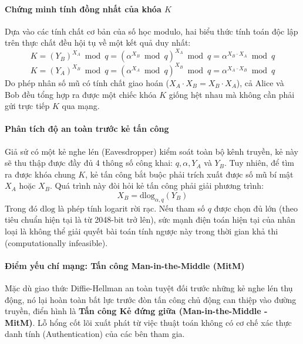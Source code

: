 \paragraph*{Chứng minh tính đồng nhất của khóa $K$}
Dựa vào các tính chất cơ bản của số học modulo, hai biểu thức tính toán độc lập trên thực chất đều hội tụ về một kết quả duy nhất:
$$K = (Y_B)^{X_A} \bmod q = (\alpha^{X_B} \bmod q)^{X_A} \bmod q = \alpha^{X_B \cdot X_A} \bmod q$$
$$K = (Y_A)^{X_B} \bmod q = (\alpha^{X_A} \bmod q)^{X_B} \bmod q = \alpha^{X_A \cdot X_B} \bmod q$$
Do phép nhân số mũ có tính chất giao hoán ($X_A \cdot X_B = X_B \cdot X_A$), cả Alice và Bob đều tổng hợp ra được một chiếc khóa $K$ giống hệt nhau mà không cần phải gửi trực tiếp $K$ qua mạng.

\paragraph*{Phân tích độ an toàn trước kẻ tấn công}
Giả sử có một kẻ nghe lén (Eavesdropper) kiểm soát toàn bộ kênh truyền, kẻ này sẽ thu thập được đầy đủ 4 thông số công khai: $q, \alpha, Y_A$ và $Y_B$. Tuy nhiên, để tìm ra được khóa chung $K$, kẻ tấn công bắt buộc phải trích xuất được số mũ bí mật $X_A$ hoặc $X_B$. Quá trình này đòi hỏi kẻ tấn công phải giải phương trình:
$$X_B = \mathrm{dlog}_{\alpha, q}(Y_B)$$
Trong đó $\mathrm{dlog}$ là phép tính logarit rời rạc. Nếu tham số $q$ được chọn đủ lớn (theo tiêu chuẩn hiện tại là từ 2048-bit trở lên), sức mạnh điện toán hiện tại của nhân loại là không thể giải quyết bài toán tính ngược này trong thời gian khả thi (computationally infeasible).
\paragraph*{Điểm yếu chí mạng: Tấn công Man-in-the-Middle (MitM)}

Mặc dù giao thức Diffie-Hellman an toàn tuyệt đối trước những kẻ nghe lén thụ động, nó lại hoàn toàn bất lực trước đòn tấn công chủ động can thiệp vào đường truyền, điển hình là \textbf{Tấn công Kẻ đứng giữa (Man-in-the-Middle - MitM)}. Lỗ hổng cốt lõi xuất phát từ việc thuật toán không có cơ chế xác thực danh tính (Authentication) của các bên tham gia.

